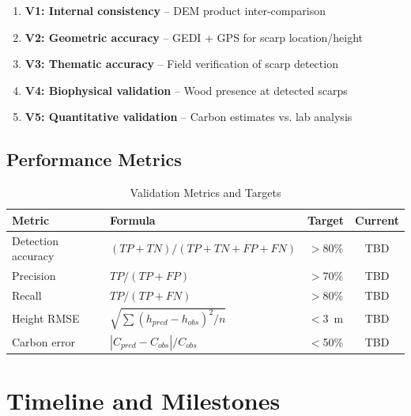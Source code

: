 \documentclass[11pt,letterpaper]{article}
\begin{document}
\begin{enumerate}
    \item \textbf{V1: Internal consistency} -- DEM product inter-comparison
    \item \textbf{V2: Geometric accuracy} -- GEDI + GPS for scarp location/height
    \item \textbf{V3: Thematic accuracy} -- Field verification of scarp detection
    \item \textbf{V4: Biophysical validation} -- Wood presence at detected scarps
    \item \textbf{V5: Quantitative validation} -- Carbon estimates vs. lab analysis
\end{enumerate}

\subsection{Performance Metrics}

\begin{table}[h]
\centering
\caption{Validation Metrics and Targets}
\label{tab:validation_metrics}
\begin{tabular}{llcc}
\toprule
\textbf{Metric} & \textbf{Formula} & \textbf{Target} & \textbf{Current} \\
\midrule
Detection accuracy & $(TP + TN) / (TP + TN + FP + FN)$ & $>$80\% & TBD \\
Precision & $TP / (TP + FP)$ & $>$70\% & TBD \\
Recall & $TP / (TP + FN)$ & $>$80\% & TBD \\
Height RMSE & $\sqrt{\sum(h_{pred} - h_{obs})^2 / n}$ & $<$\SI{3}{m} & TBD \\
Carbon error & $|C_{pred} - C_{obs}| / C_{obs}$ & $<$50\% & TBD \\
\bottomrule
\end{tabular}
\end{table}

\section{Timeline and Milestones}
\label{sec:timeline}
\end{document}
